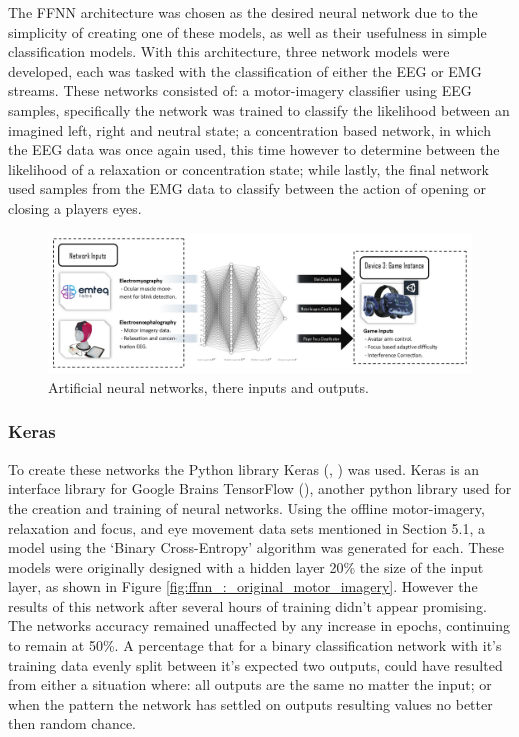 \documentclass[11pt, a4paper]{article}
\newcommand{\ccite}[1]{(\citeauthor{#1}, \citeyear{#1})}
\newcommand{\cciteyear}[1]{(\citeyear{#1})}
\newcommand{\reffigure}[1]{Figure \ref{#1}}
\begin{document}
\hfill

The FFNN architecture was chosen as the desired neural network due to the simplicity of creating one of these models, as well as their usefulness in simple classification models. With this architecture, three network models were developed, each was tasked with the classification of either the EEG or EMG streams. These networks consisted of: a motor-imagery classifier using EEG samples, specifically the network was trained to classify the likelihood between an imagined left, right and neutral state; a concentration based network, in which the EEG data was once again used, this time however to determine between the likelihood of a relaxation or concentration state; while lastly, the final network used samples from the EMG data to classify between the action of opening or closing a players eyes.


\begin{figure}[H]
	\centering
	\includegraphics[width = 0.9 \linewidth] {[ Figures ]/System Diagram - Machine Learning.png}
	\captionsetup{font = small, labelfont = small, width=.8\linewidth}
	\caption{Artificial neural networks, there inputs and outputs.}
	\label{fig:system_diagram_:_machine_learning}
\end{figure}


\subsubsection{Keras}	 

To create these networks the Python library Keras \ccite{keras} was used. Keras is an interface library for Google Brains TensorFlow \cciteyear{tensorflow}, another python library used for the creation and training of neural networks. Using the offline motor-imagery, relaxation and focus, and eye movement data sets mentioned in Section 5.1, a model using the `Binary Cross-Entropy' algorithm was generated for each. These models were originally designed with a hidden layer 20\% the size of the input layer, as shown in \reffigure{fig:ffnn_:_original_motor_imagery}. However the results of this network after several hours of training didn't appear promising. The networks accuracy remained unaffected by any increase in epochs, continuing to remain at 50\%. A percentage that for a binary classification network with it's training data evenly split between it's expected two outputs, could have resulted from either a situation where: all outputs are the same no matter the input; or when the pattern the network has settled on outputs resulting values no better then random chance. 
\end{document}
